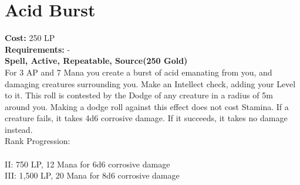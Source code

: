 \section{Acid Burst}\label{spell:acidBurst}
\textbf{Cost:} 250 LP\\
\textbf{Requirements:} -\\
\textbf{Spell, Active, Repeatable, Source(250 Gold)}\\
For 3 AP and 7 Mana you create a burst of acid emanating from you, and damaging creatures surrounding you.
Make an Intellect check, adding your Level to it.
This roll is contested by the Dodge of any creature in a radius of 5m around you.
Making a dodge roll against this effect does not cost Stamina.
If a creature fails, it takes 4d6 corrosive damage.
If it succeeds, it takes no damage instead.
\\
Rank Progression:\\
\\
II: 750 LP, 12 Mana for 6d6 corrosive damage\\
III: 1,500 LP, 20 Mana for 8d6 corrosive damage\\
